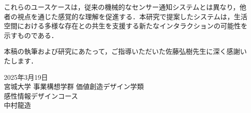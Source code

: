 \documentclass{cuxarticle}
\begin{document}
これらのユースケースは，従来の機械的なセンサー通知システムとは異なり，他者の視点を通じた感覚的な理解を促進する．本研究で提案したシステムは，生活空間における多様な存在との共生を支援する新たなインタラクションの可能性を示すものである．

本稿の執筆および研究にあたって，ご指導いただいた佐藤弘樹先生に深く感謝いたします．

\vspace{3\zh}
\begin{flushright}
  2025年3月19日 \\
  宮城大学 事業構想学群 価値創造デザイン学類 \\
  感性情報デザインコース \\
  中村龍造
\end{flushright}

\newpage
\renewcommand{\refname}{\huge 参考文献}


\end{document}
